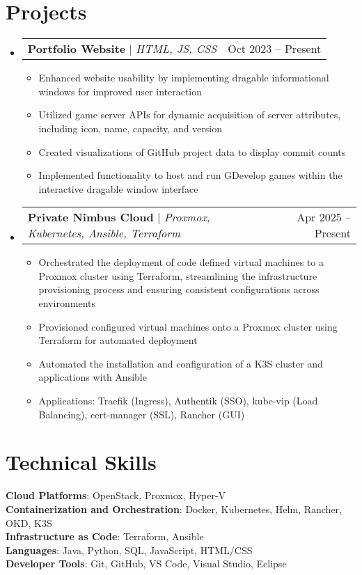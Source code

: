 \documentclass[letterpaper,11pt]{article}
\makeatletter
\newcommand{\resumeItem}[1]{
  \item\small{
    {#1 \vspace{-2pt}}
  }
}
\newcommand{\resumeProjectHeading}[2]{
    \item
    \begin{tabular*}{0.97\textwidth}{l@{\extracolsep{\fill}}r}
      \small#1 & #2 \\
    \end{tabular*}\vspace{-7pt}
}
\newcommand{\resumeSubHeadingListStart}{\begin{itemize}[leftmargin=0.15in, label={}]}
\newcommand{\resumeSubHeadingListEnd}{\end{itemize}}
\newcommand{\resumeItemListStart}{\begin{itemize}}
\newcommand{\resumeItemListEnd}{\end{itemize}\vspace{-5pt}}
\makeatother
\begin{document}
\section{Projects}
    \resumeSubHeadingListStart
      \resumeProjectHeading
          {\textbf{Portfolio Website} $|$ \emph{HTML, JS, CSS}}{Oct 2023 -- Present}
          \resumeItemListStart
            \resumeItem{Enhanced website usability by implementing dragable informational windows for improved user interaction}
            \resumeItem{Utilized game server APIs for dynamic acquisition of server attributes, including icon, name, capacity, and version}
            \resumeItem{Created visualizations of GitHub project data to display commit counts}
            \resumeItem{Implemented functionality to host and run GDevelop games within the interactive dragable window interface}
          \resumeItemListEnd

      \resumeProjectHeading
          {\textbf{Private Nimbus Cloud} $|$ \emph{Proxmox, Kubernetes, Ansible, Terraform}}{Apr 2025 -- Present}
          \resumeItemListStart
            \resumeItem{Orchestrated the deployment of code defined virtual machines to a Proxmox cluster using Terraform, streamlining the infrastructure provisioning process and ensuring consistent configurations across environments}
            \resumeItem{Provisioned configured virtual machines onto a Proxmox cluster using Terraform for automated deployment}
            \resumeItem{Automated the installation and configuration of a K3S cluster and applications with Ansible}
            \resumeItem{Applications: Traefik (Ingress), Authentik (SSO), kube-vip (Load Balancing), cert-manager (SSL), Rancher (GUI)}
          \resumeItemListEnd
    \resumeSubHeadingListEnd


%
\section{Technical Skills}
 \begin{itemize}[leftmargin=0.15in, label={}]
    \small{\item{
     \textbf{Cloud Platforms}{: OpenStack, Proxmox, Hyper-V} \\
     \textbf{Containerization and Orchestration}{: Docker, Kubernetes, Helm, Rancher, OKD, K3S} \\
     \textbf{Infrastructure as Code}{: Terraform, Ansible} \\
     \textbf{Languages}{: Java, Python, SQL, JavaScript, HTML/CSS} \\
     \textbf{Developer Tools}{: Git, GitHub, VS Code, Visual Studio, Eclipse}
    }}
 \end{itemize}


\end{document}

